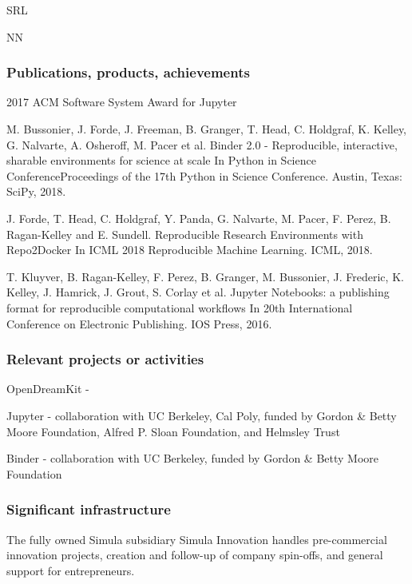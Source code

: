 \begin{sitedescription}{SRL}
\begin{participant}[PM=72, type=R]{NN}
\end{participant}


\subsubsection*{Publications, products, achievements}

\begin{compactenum}
\item 2017 ACM Software System Award for Jupyter
\item M. Bussonier, J. Forde, J. Freeman, B. Granger, T. Head, C. Holdgraf, K.
  Kelley, G. Nalvarte, A. Osheroff, M. Pacer et al. Binder 2.0 - Reproducible,
  interactive, sharable environments for science at scale In Python in Science
  ConferenceProceedings of the 17th Python in Science Conference. Austin,
  Texas: SciPy, 2018.
\item J. Forde, T. Head, C. Holdgraf, Y. Panda, G. Nalvarte, M. Pacer, F.
  Perez, B. Ragan-Kelley and E. Sundell. Reproducible Research Environments
  with Repo2Docker In ICML 2018 Reproducible Machine Learning. ICML, 2018.
\item T. Kluyver, B. Ragan-Kelley, F. Perez, B. Granger, M. Bussonier, J.
  Frederic, K. Kelley, J. Hamrick, J. Grout, S. Corlay et al. Jupyter
  Notebooks: a publishing format for reproducible computational workflows In
  20th International Conference on Electronic Publishing. IOS Press, 2016.

\end{compactenum}

\subsubsection*{Relevant projects or activities}

\begin{compactenum}
\item OpenDreamKit -
\item Jupyter - collaboration with UC Berkeley, Cal Poly, funded by Gordon \&
  Betty Moore Foundation, Alfred P. Sloan Foundation, and Helmsley Trust
\item Binder - collaboration with UC Berkeley, funded by Gordon \& Betty Moore
  Foundation
\end{compactenum}

\subsubsection*{Significant infrastructure}

The fully owned Simula subsidiary Simula Innovation handles pre-commercial
innovation projects, creation and follow-up of company spin-offs, and general
support for entrepreneurs.

\end{sitedescription}



